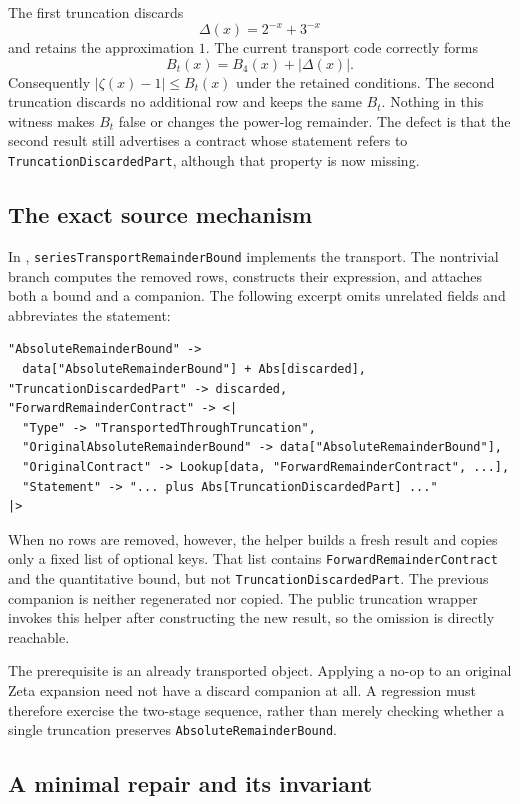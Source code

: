 \documentclass[11pt,letterpaper]{article}
\newcommand{\prop}[1]{\texttt{#1}}
\begin{document}
The first truncation discards
\[
 \Delta(x)=2^{-x}+3^{-x}
\]
and retains the approximation $1$. The current transport code correctly forms
\[
 B_t(x)=B_4(x)+|\Delta(x)|.
\]
Consequently $|\zeta(x)-1|\le B_t(x)$ under the retained conditions. The second
truncation discards no additional row and keeps the same $B_t$. Nothing in this
witness makes $B_t$ false or changes the power-log remainder. The defect is that
the second result still advertises a contract whose statement refers to
\prop{TruncationDiscardedPart}, although that property is now missing.

\subsection{The exact source mechanism}

In ,
\prop{seriesTransportRemainderBound} implements the transport. The nontrivial branch computes the removed
rows, constructs their expression, and attaches both a bound and a companion.
The following excerpt omits unrelated fields and abbreviates the statement:
\begin{lstlisting}[language=Wolfram]
"AbsoluteRemainderBound" ->
  data["AbsoluteRemainderBound"] + Abs[discarded],
"TruncationDiscardedPart" -> discarded,
"ForwardRemainderContract" -> <|
  "Type" -> "TransportedThroughTruncation",
  "OriginalAbsoluteRemainderBound" -> data["AbsoluteRemainderBound"],
  "OriginalContract" -> Lookup[data, "ForwardRemainderContract", ...],
  "Statement" -> "... plus Abs[TruncationDiscardedPart] ..."
|>
\end{lstlisting}

When no rows are removed, however, the helper builds a fresh result and copies
only a fixed list of optional keys. That list contains
\prop{ForwardRemainderContract} and the quantitative bound, but not
\prop{TruncationDiscardedPart}. The previous companion is neither regenerated nor
copied. The public truncation wrapper invokes this helper after constructing the
new result, so the omission is directly reachable.\cite{operations}

The prerequisite is an already transported object. Applying a no-op to an
original Zeta expansion need not have a discard companion at all. A regression
must therefore exercise the two-stage sequence, rather than merely checking
whether a single truncation preserves \prop{AbsoluteRemainderBound}.

\subsection{A minimal repair and its invariant}
\end{document}
